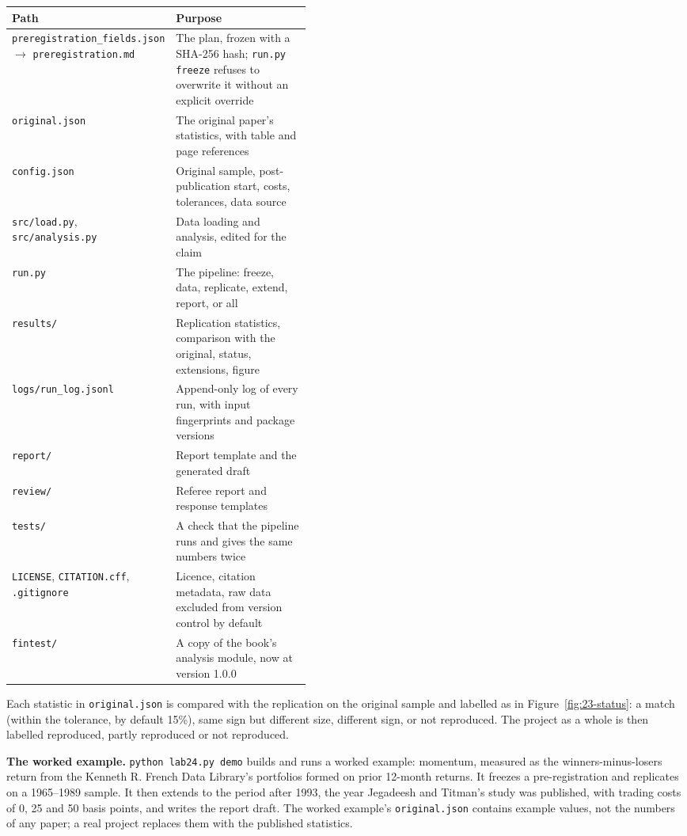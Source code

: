 \begin{center}
\small
\begin{tabularx}{0.9\linewidth}{@{}>{\raggedright\arraybackslash}p{0.44\linewidth}>{\raggedright\arraybackslash}X@{}}
\toprule
Path & Purpose \\
\midrule
\texttt{preregistration\_fields.json} $\rightarrow$ \texttt{preregistration.md} & The plan, frozen with a SHA-256 hash; \texttt{run.py freeze} refuses to overwrite it without an explicit override \\
\texttt{original.json} & The original paper's statistics, with table and page references \\
\texttt{config.json} & Original sample, post-publication start, costs, tolerances, data source \\
\texttt{src/load.py}, \texttt{src/analysis.py} & Data loading and analysis, edited for the claim \\
\texttt{run.py} & The pipeline: freeze, data, replicate, extend, report, or all \\
\texttt{results/} & Replication statistics, comparison with the original, status, extensions, figure \\
\texttt{logs/run\_log.jsonl} & Append-only log of every run, with input fingerprints and package versions \\
\texttt{report/} & Report template and the generated draft \\
\texttt{review/} & Referee report and response templates \\
\texttt{tests/} & A check that the pipeline runs and gives the same numbers twice \\
\texttt{LICENSE}, \texttt{CITATION.cff}, \texttt{.gitignore} & Licence, citation metadata, raw data excluded from version control by default \\
\texttt{fintest/} & A copy of the book's analysis module, now at version 1.0.0 \\
\bottomrule
\end{tabularx}
\end{center}

Each statistic in \texttt{original.json} is compared with the replication on the original sample and labelled as in Figure~\ref{fig:23-status}: a match (within the tolerance, by default 15\%), same sign but different size, different sign, or not reproduced. The project as a whole is then labelled reproduced, partly reproduced or not reproduced.

\textbf{The worked example.} \texttt{python lab24.py demo} builds and runs a worked example: momentum, measured as the winners-minus-losers return from the Kenneth R. French Data Library's portfolios formed on prior 12-month returns. It freezes a pre-registration and replicates on a 1965--1989 sample. It then extends to the period after 1993, the year Jegadeesh and Titman's study was published, with trading costs of 0, 25 and 50 basis points, and writes the report draft. The worked example's \texttt{original.json} contains example values, not the numbers of any paper; a real project replaces them with the published statistics.


